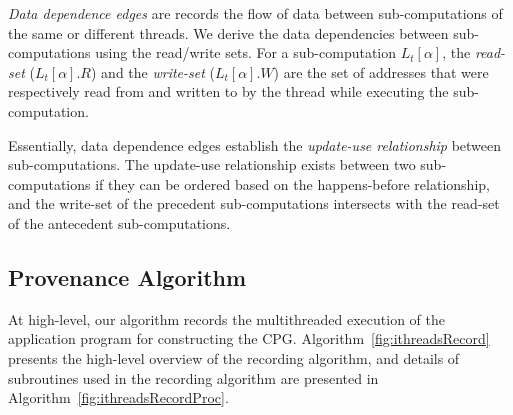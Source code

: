   {\em Data dependence edges} are records the flow of data between sub-computations of the same or different threads. 
 We derive the data dependencies between sub-computations using the read/write sets. For a sub-computation $L_t[\alpha]$, the {\em read-set}
($L_t[\alpha].R$) and the {\em write-set} ($L_t[\alpha].W$) are the set of
addresses that were respectively read from and written to by
the thread while executing the sub-computation. 

Essentially, data dependence edges establish the {\em update-use relationship} between sub-computations. The update-use relationship exists between two sub-computations if they can be  ordered based on the happens-before relationship, and the write-set of the  precedent  sub-computations intersects with the read-set of the antecedent sub-computations. 







 
 
 \subsection{ Provenance Algorithm}

 
 
At high-level, our algorithm records the multithreaded execution of the
application program for constructing the CPG.
Algorithm~\ref{fig:ithreadsRecord} presents the high-level
overview of the recording algorithm, and details of subroutines used in the recording algorithm are presented in Algorithm~\ref{fig:ithreadsRecordProc}.
  

